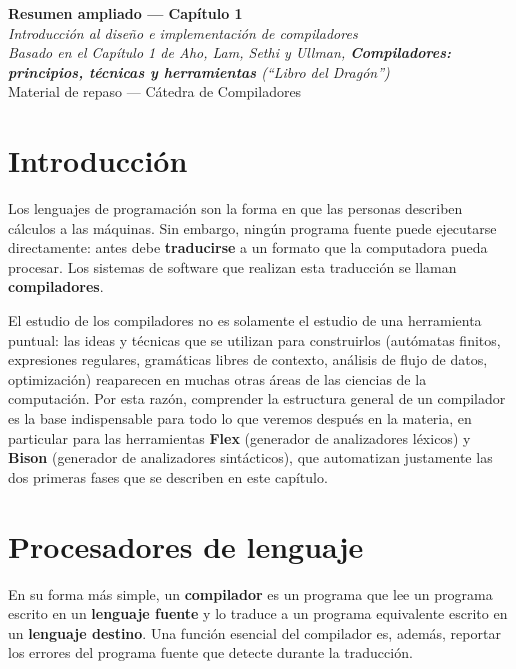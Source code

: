 \documentclass[11pt,a4paper]{article}
\begin{document}
\begin{center}
    {\LARGE \textbf{Resumen ampliado --- Capítulo 1}}\\[4pt]
    {\Large \textit{Introducción al diseño e implementación de compiladores}}\\[4pt]
    \textit{Basado en el Capítulo 1 de Aho, Lam, Sethi y Ullman, \textbf{Compiladores: principios,
    técnicas y herramientas} (``Libro del Dragón'')}\\[2pt]
    \small Material de repaso --- Cátedra de Compiladores
\end{center}

\vspace{0.4cm}

\tableofcontents

\bigskip

\section{Introducción}

Los lenguajes de programación son la forma en que las personas describen cálculos a las
máquinas. Sin embargo, ningún programa fuente puede ejecutarse directamente: antes debe
\textbf{traducirse} a un formato que la computadora pueda procesar. Los sistemas de software
que realizan esta traducción se llaman \textbf{compiladores}.

El estudio de los compiladores no es solamente el estudio de una herramienta puntual: las
ideas y técnicas que se utilizan para construirlos (autómatas finitos, expresiones regulares,
gramáticas libres de contexto, análisis de flujo de datos, optimización) reaparecen en muchas
otras áreas de las ciencias de la computación. Por esta razón, comprender la estructura general
de un compilador es la base indispensable para todo lo que veremos después en la materia,
en particular para las herramientas \textbf{Flex} (generador de analizadores léxicos) y
\textbf{Bison} (generador de analizadores sintácticos), que automatizan justamente las dos
primeras fases que se describen en este capítulo.

\section{Procesadores de lenguaje}

En su forma más simple, un \textbf{compilador} es un programa que lee un programa escrito en
un \textbf{lenguaje fuente} y lo traduce a un programa equivalente escrito en un
\textbf{lenguaje destino}. Una función esencial del compilador es, además, reportar los
errores del programa fuente que detecte durante la traducción.
\end{document}
